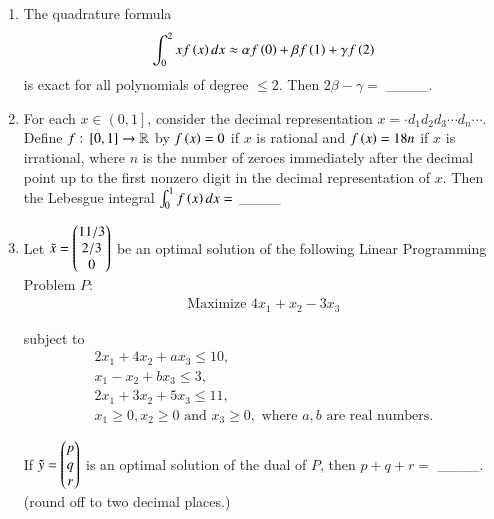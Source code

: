\documentclass[journal]{IEEEtran}
\begin{document}
\begin{enumerate}
    \item The quadrature formula
        \begin{align*}
            \int_0^2 x f \left(x\right) dx \approx \alpha f \left(0\right) + \beta f \left(1\right) + \gamma f \left(2\right)
        \end{align*}
        is exact for all polynomials of degree $\leq 2$. Then $2\beta - \gamma =$ \_\_\_\_.

    \item For each $x \in\left( 0,1 \right]$, consider the decimal representation $x = \cdot d_1 d_2 d_3 \cdots d_n \cdots$. Define $f : {}\left[ 0,1 \right] \rightarrow \mathbb{R}$ by $f\left(x\right) = 0$ if $x$ is rational and $f\left(x\right) = 18n$ if $x$ is irrational, where $n$ is the number of zeroes immediately after the decimal point up to the first nonzero digit in the decimal representation of $x$. Then the Lebesgue integral $\int_0^1 f \left(x\right) dx =$ \_\_\_\_

    \item \label{55} Let $\tilde{x} = \begin{pmatrix}11/3 \\ 2/3 \\ 0\end{pmatrix}$ be an optimal solution of the following Linear Programming Problem $P:$
        \begin{align*}
            \text{Maximize } 4x_1 + x_2 - 3x_3
        \end{align*}

        subject to
        \begin{align*}
            2x_1 + 4x_2 + a x_3 \leq 10,\\
            x_1 - x_2 + bx_3 \leq 3,\\
            2x_1 + 3x_2 + 5x_3 \leq 11,\\
            x_1 \geq 0, x_2 \geq 0 \text{ and } x_3 \geq 0, \text{ where } a,b \text{ are real numbers.}
        \end{align*}

        If $\tilde{y} = \begin{pmatrix}p\\q\\r\end{pmatrix}$ is an optimal solution of the dual of $P$, then $p+q+r=$ \_\_\_\_. (round off to two decimal places.)
\end{enumerate}



  
\end{document}
